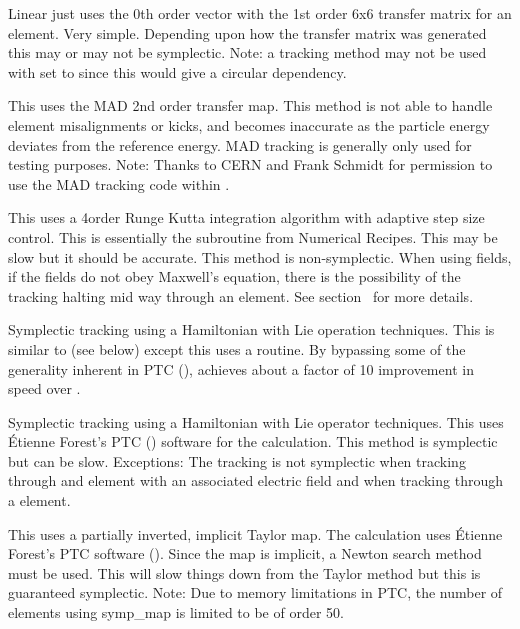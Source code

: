 \begin{description}
\item[\vn{Linear}]
Linear just uses the 0th order vector with the 1st order 6x6 transfer matrix for an element. Very
simple. Depending upon how the transfer matrix was generated this may or may not be
symplectic. Note: a  tracking method may not be used with  set to
 since this would give a circular dependency.

\item[\vn{MAD}]
This uses the MAD 2nd order transfer map. This method is not able to
handle element misalignments or kicks, and becomes inaccurate as the
particle energy deviates from the reference energy. MAD tracking is
generally only used for testing purposes. Note: Thanks to CERN and
Frank Schmidt for permission to use the MAD tracking code within
\bmad.

\item[\vn{runge_kutta}]
This uses a 4\Th order Runge Kutta integration algorithm with adaptive step size control.  This is
essentially the  subroutine from Numerical Recipes\cite{b:nr}. This may be slow but it
should be accurate. This method is non-symplectic.  When using  fields, if
the fields do not obey Maxwell's equation, there is the possibility of the  tracking
halting mid way through an element. See section~ for more details.

\item[\vn{Symp_Lie_Bmad}]
Symplectic tracking using a Hamiltonian with Lie operation techniques.  This is similar to
 (see below) except this uses a \bmad routine. By bypassing some of the generality
inherent in PTC (),  achieves about a factor of 10 improvement
in speed over .

\item[\vn{Symp_Lie_PTC}]
Symplectic tracking using a Hamiltonian with Lie operator techniques.  This uses \'Etienne Forest's
PTC () software for the calculation. This method is symplectic but can be
slow. Exceptions: The tracking is not symplectic when tracking through and element with an
associated electric field and when tracking through a  element.

\item[\vn{Symp_Map}]
This uses a partially inverted, implicit Taylor map. The calculation uses \'Etienne Forest's PTC
software ().  Since the map is implicit, a Newton search method must be used. This
will slow things down from the Taylor method but this is guaranteed symplectic. Note: Due to memory
limitations in PTC, the number of elements using symp_map is limited to be of order 50.


\end{description}
